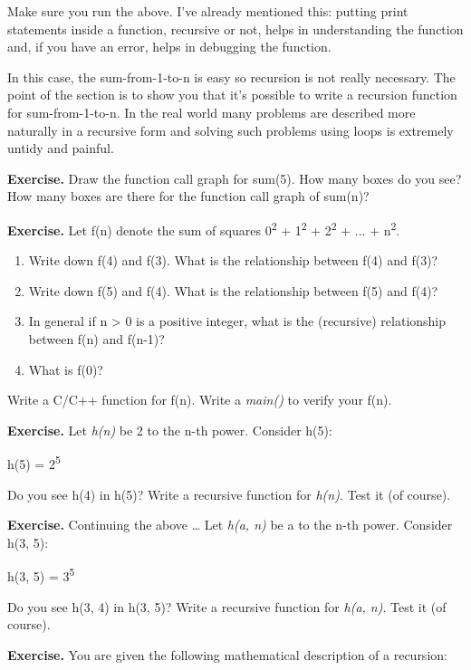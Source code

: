 \documentclass[
]{article}
\providecommand{\tightlist}{%
  \setlength{\itemsep}{0pt}\setlength{\parskip}{0pt}}
\begin{document}
Make sure you run the above. I've already mentioned this: putting print
statements inside a function, recursive or not, helps in understanding
the function and, if you have an error, helps in debugging the function.

In this case, the sum-from-1-to-n is easy so recursion is not really
necessary. The point of the section is to show you that it's possible to
write a recursion function for sum-from-1-to-n. In the real world many
problems are described more naturally in a recursive form and solving
such problems using loops is extremely untidy and painful.

\textbf{Exercise.} Draw the function call graph for sum(5). How many
boxes do you see? How many boxes are there for the function call graph
of sum(n)?

\textbf{Exercise.} Let f(n) denote the sum of squares
0\textsuperscript{2} + 1\textsuperscript{2} + 2\textsuperscript{2} + ...
+ n\textsuperscript{2}.

\begin{enumerate}
\def\labelenumi{(\alph{enumi})}
\tightlist
\item
  Write down f(4) and f(3). What is the relationship between f(4) and
  f(3)?
\item
  Write down f(5) and f(4). What is the relationship between f(5) and
  f(4)?
\item
  In general if n \textgreater{} 0 is a positive integer, what is the
  (recursive) relationship between f(n) and f(n-1)?
\item
  What is f(0)?
\end{enumerate}

Write a C/C++ function for f(n). Write a \emph{main()} to verify your
f(n).

\textbf{Exercise.} Let \emph{h(n)} be 2 to the n-th power. Consider
h(5):

h(5) = 2\textsuperscript{5}

Do you see h(4) in h(5)? Write a recursive function for \emph{h(n)}.
Test it (of course).

\textbf{Exercise.} Continuing the above \ldots{} Let \emph{h(a, n)} be a
to the n-th power. Consider h(3, 5):

h(3, 5) = 3\textsuperscript{5}

Do you see h(3, 4) in h(3, 5)? Write a recursive function for \emph{h(a,
n)}. Test it (of course).

\textbf{Exercise.} You are given the following mathematical description
of a recursion:
\end{document}
